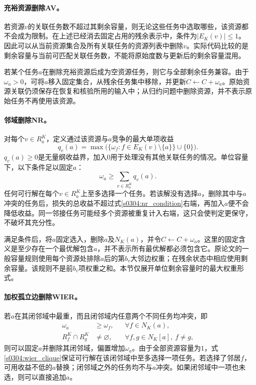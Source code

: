 \paragraph{充裕资源删除AV。}
若资源$v$的关联任务数不超过其剩余容量，则无论这些任务中选取哪些，该资源都不会成为限制。在上述已经消去固定占用的残余表示中，条件为$|E_K(v)|\leq1$。因此可以从当前资源集合及所有关联任务的资源列表中删除$v$。实际代码比较的是剩余容量与当前可匹配关联任务数，不能将原始度数与更新后的剩余容量混用。

若某个任务$a$在删除充裕资源后成为空资源任务，则它与全部剩余任务兼容。由于$\omega_a>0$，可将$a$移入固定集合，从残余任务集中移除，并更新$C\leftarrow C+\omega_a$。原始资源关联仍须保存在恢复和核验所用的输入中；从归约问题中删除资源，并不表示原始任务不再使用该资源。

\paragraph{邻域删除NR。}
对每个$v\in R_a^K$，定义通过该资源与$a$竞争的最大单项收益
\begin{equation}
 q_v(a)=\max\bigl(\{\omega_f:f\in E_K(v)\setminus\{a\}\}\cup\{0\}\bigr).
 \label{s0304:nr_resource_bound}
\end{equation}
$q_v(a)\geq0$是无量纲收益界，加入$0$用于处理没有其他关联任务的情况。单位容量下，以下条件足以固定$a$：
\begin{equation}
 \omega_a\geq\sum_{v\in R_a^K}q_v(a).
 \label{s0304:nr_condition}
\end{equation}
任何可行解在每个$v\in R_a^K$上至多选择一个任务。若该解没有选择$a$，删除其中与$a$冲突的任务后，损失的总收益不超过式\eqref{s0304:nr_condition}右端，再加入$a$便不会降低收益。同一邻接任务可能经多个资源被重复计入右端，这只会使判定更保守，不破坏其充分性。

满足条件后，将$a$固定选入，删除$a$及$N_K(a)$，并令$C\leftarrow C+\omega_a$。这里的固定含义是至少存在一个最优解包含$a$，并不表示所有最优解都必须包含它。原论文的一般容量规则使用每个资源处排除$a$后的第$b_v$大邻边权重；在残余状态中相应使用剩余容量。该规则不是前$b_v$项权重之和。本节仅展开单位剩余容量时的最大权重形式。

\paragraph{加权孤立边删除WIER。}
若$a$在其闭邻域中最重，而且闭邻域内任意两个不同任务均冲突，即
\begin{align}
 \omega_a&\geq\omega_f,
 &&\forall f\in N_K(a),
 \label{s0304:wier_weight}\\
 R_f^K\cap R_g^K&\ne\varnothing,
 &&\forall f,g\in N_K[a],\ f\ne g,
 \label{s0304:wier_clique}
\end{align}
则可以固定$a$并删除其闭邻域，偏置增加$\omega_a$。由于全部资源容量为$1$，式\eqref{s0304:wier_clique}保证可行解在该闭邻域中至多选择一项任务。若选择了邻居$f$，可用收益不低的$a$替换；闭邻域之外的任务均不与$a$冲突。如果闭邻域中一项也未选，则可以直接追加$a$。

